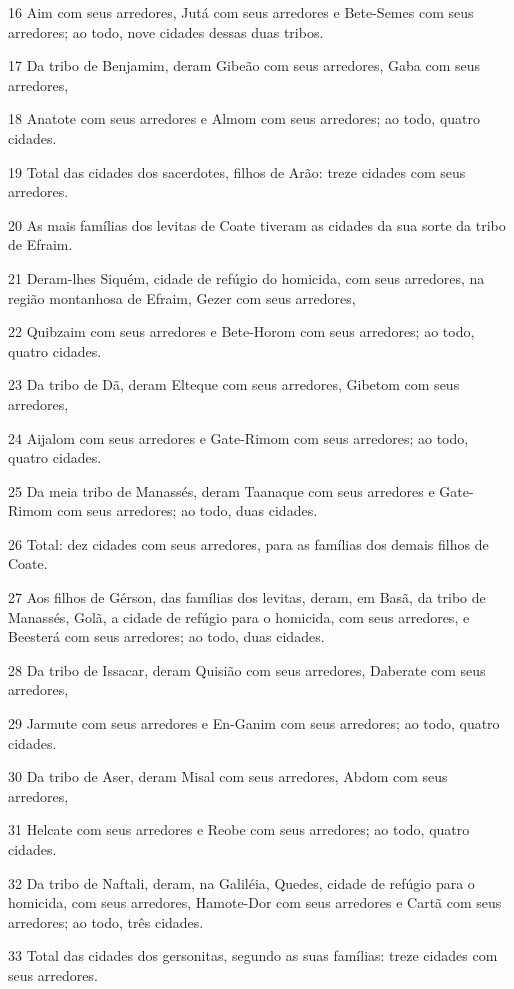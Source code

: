 \par 16 Aim com seus arredores, Jutá com seus arredores e Bete-Semes com seus arredores; ao todo, nove cidades dessas duas tribos.
\par 17 Da tribo de Benjamim, deram Gibeão com seus arredores, Gaba com seus arredores,
\par 18 Anatote com seus arredores e Almom com seus arredores; ao todo, quatro cidades.
\par 19 Total das cidades dos sacerdotes, filhos de Arão: treze cidades com seus arredores.
\par 20 As mais famílias dos levitas de Coate tiveram as cidades da sua sorte da tribo de Efraim.
\par 21 Deram-lhes Siquém, cidade de refúgio do homicida, com seus arredores, na região montanhosa de Efraim, Gezer com seus arredores,
\par 22 Quibzaim com seus arredores e Bete-Horom com seus arredores; ao todo, quatro cidades.
\par 23 Da tribo de Dã, deram Elteque com seus arredores, Gibetom com seus arredores,
\par 24 Aijalom com seus arredores e Gate-Rimom com seus arredores; ao todo, quatro cidades.
\par 25 Da meia tribo de Manassés, deram Taanaque com seus arredores e Gate-Rimom com seus arredores; ao todo, duas cidades.
\par 26 Total: dez cidades com seus arredores, para as famílias dos demais filhos de Coate.
\par 27 Aos filhos de Gérson, das famílias dos levitas, deram, em Basã, da tribo de Manassés, Golã, a cidade de refúgio para o homicida, com seus arredores, e Beesterá com seus arredores; ao todo, duas cidades.
\par 28 Da tribo de Issacar, deram Quisião com seus arredores, Daberate com seus arredores,
\par 29 Jarmute com seus arredores e En-Ganim com seus arredores; ao todo, quatro cidades.
\par 30 Da tribo de Aser, deram Misal com seus arredores, Abdom com seus arredores,
\par 31 Helcate com seus arredores e Reobe com seus arredores; ao todo, quatro cidades.
\par 32 Da tribo de Naftali, deram, na Galiléia, Quedes, cidade de refúgio para o homicida, com seus arredores, Hamote-Dor com seus arredores e Cartã com seus arredores; ao todo, três cidades.
\par 33 Total das cidades dos gersonitas, segundo as suas famílias: treze cidades com seus arredores.

